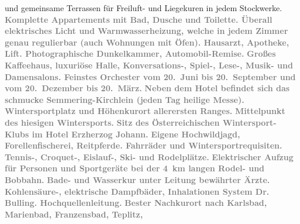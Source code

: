 \begin{ledgroupsized}[t]{13cm}
{{                  und gemeinsame Terrassen für Freiluft- und Liegekuren in jedem Stockwerke.}}\pend
           \pstart
           \noindent{}\centering{}\textcolor{gray}{\textbf{Komplette Appartements mit Bad, Dusche und Toilette. Überall
                  elektrisches Licht und Warmwasserheizung, welche in jedem Zimmer genau regulierbar
                  (auch Wohnungen mit Öfen). Hausarzt, Apotheke, Lift. Photographische Dunkelkammer,
                  Automobil-Remise.}}\pend
           \pstart
           \noindent{}\centering{}\textcolor{gray}{\textbf{Großes Kaffeehaus, luxuriöse Halle, Konversations-, Spiel-,
                  Lese-, Musik- und Damensalons. Feinstes Orchester vom 20. Juni bis 20. September
                  und vom 20. Dezember bis 20. März.}}\pend
           \pstart
           \noindent{}\centering{}\textcolor{gray}{\textbf{Neben dem Hotel befindet sich das schmucke Semmering-Kirchlein (jeden Tag heilige Messe).}}\pend
           \pstart
           \noindent{}\centering{}\textcolor{gray}{\textbf{Wintersportplatz und Höhenkurort allerersten Ranges.}}\pend
           \pstart
           \noindent{}\centering{}\textcolor{gray}{\textbf{Mittelpunkt des hiesigen Wintersports.}}\pend
           \pstart
           \noindent{}\centering{}\textcolor{gray}{\textbf{Sitz des Österreichischen
                     Wintersport-Klubs im Hotel Erzherzog
                     Johann.}}\pend
           \pstart
           \noindent{}\centering{}\textcolor{gray}{\textbf{Eigene Hochwildjagd, Forellenfischerei, Reitpferde. Fahrräder
                  und Wintersportrequisiten.}}\pend
           \pstart
           \noindent{}\centering{}\textcolor{gray}{\textbf{Tennis-, Croquet-, Eislauf-, Ski- und Rodelplätze.}}\pend
           \pstart
           \noindent{}\centering{}\textcolor{gray}{\textbf{Elektrischer Aufzug für Personen und Sportgeräte bei der 4 km
                  langen Rodel- und Bobbahn.}}\pend
           \pstart
           \noindent{}\centering{}\textcolor{gray}{\textbf{Bade- und Wasserkur unter Leitung bewährter Ärzte. Kohlensäure-,
                  elektrische Dampfbäder, Inhalationen System Dr. Bulling. Hochquellenleitung.}}\pend
           \pstart
           \noindent{}\centering{}\textcolor{gray}{\textbf{Bester Nachkurort nach Karlsbad, Marienbad, Franzensbad, Teplitz,
}}
\end{ledgroupsized}
